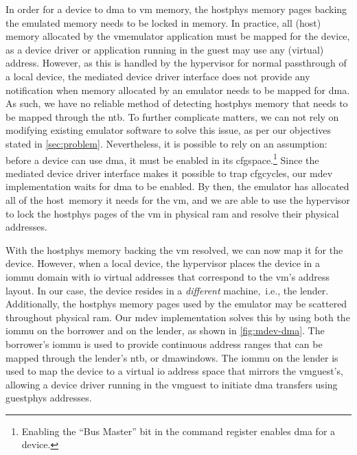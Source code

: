 In order for a device to \gls{dma} to \gls{vm} memory, the \gls{hostphys} memory pages backing the emulated memory needs to be locked in memory.
%
In practice, all (\gls{host}) memory allocated by the \gls{vmemulator} application must be mapped for the device, as a device driver or application running in the \gls{guest} may use any (virtual) address.
%
However, as this is handled by the \gls{hypervisor} for normal \gls{passthrough} of a local device, the mediated device driver interface does not provide any notification when memory allocated by an \gls{emulator} needs to be mapped for \gls{dma}.
%
As such, we have no reliable method of detecting \gls{hostphys} memory that needs to be mapped through the \gls{ntb}.
%
To further complicate matters, we can not rely on modifying existing \gls{emulator} software to solve this issue, as per our objectives stated in \cref{sec:problem}.
%
Nevertheless, it is possible to rely on an assumption:
%
before a device can use \gls{dma}, it must be enabled in its \gls{cfgspace}.\footnote{Enabling the ``Bus Master'' bit in the command register enables \gls{dma} for a device.}
%
Since the mediated device driver interface makes it possible to trap \glspl{cfgcycle}, our \gls{mdev} implementation waits for \gls{dma} to be enabled.
%
By then, the \gls{emulator} has allocated all of the \gls{host}~memory it needs for the \gls{vm}, and we are able to use the \gls{hypervisor} to lock the \gls{hostphys} pages of the \gls{vm} in physical \gls{ram} and resolve their physical addresses.



With the \gls{hostphys} memory backing the \gls{vm} resolved, we can now map it for the device.
%
However, when  a local device, the \gls{hypervisor} places the device in a \gls{iommu} domain with \gls{io} virtual addresses that correspond to the \gls{vm}'s address layout.
%
In our case, the device resides in a \emph{different} machine,~i.e., the \gls{lender}.
%
Additionally, the \gls{hostphys} memory pages used by the \gls{emulator} may be scattered throughout physical \gls{ram}.
%
Our \gls{mdev} implementation solves this by using both the \gls{iommu} on the \gls{borrower} and on the \gls{lender}, as shown in \cref{fig:mdev-dma}.
%
The \gls{borrower}'s \gls{iommu} is used to provide continuous address ranges that can be mapped through the \gls{lender}'s \gls{ntb}, or \glspl{dmawindow}.
%
The \gls{iommu} on the \gls{lender} is used to map the device to a virtual \gls{io} address space that mirrors the \gls{vmguest}'s, allowing a device driver running in the \gls{vmguest} to initiate \gls{dma} transfers using \gls{guestphys} addresses.



